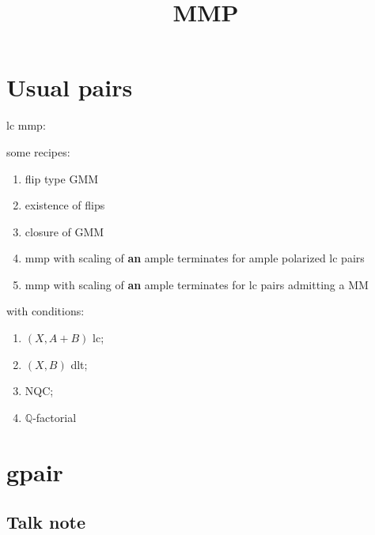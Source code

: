 \documentclass{article}
\title{MMP}
\begin{document}
\maketitle
\section{Usual pairs}
lc mmp: 

some recipes:
\begin{enumerate}
  \item flip type GMM
  \item existence of flips
  \item closure of GMM
  \item mmp with scaling of \textbf{an} ample terminates for ample polarized lc pairs
  \item mmp with scaling of \textbf{an} ample terminates for lc pairs admitting a MM
\end{enumerate}
with conditions:
\begin{enumerate}
  \item $ (X,A+B) $ lc;
  \item $ (X,B) $ dlt;
  \item NQC;
  \item $\mathbb{Q}$-factorial
\end{enumerate}

\section{gpair}

\subsection{Talk note}
\end{document}
